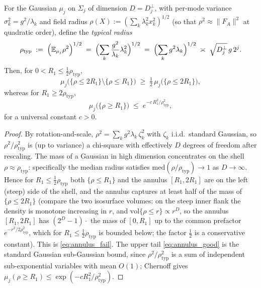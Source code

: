 \begin{lemma}
\label{lem:gaussian_shell}
For the Gaussian $\mu_j$ on $\Sigma_j$ of dimension $D=D_j^\perp$, with
per-mode variance $\sigma_k^2=g^2/\lambda_k$ and field radius
$\rho(X):=(\sum_k \lambda_k^2 x_k^2)^{1/2}$ (so that $\rho^2\approx
\|F_A\|^2$ at quadratic order), define the \emph{typical radius}
\begin{equation}
\label{eq:typical}
  \rho_{\mathrm{typ}}\;:=\;\Bigl(\mathbb{E}_{\mu_j}\rho^2\Bigr)^{1/2}
  \;=\;\Bigl(\sum_k \frac{g^2}{\lambda_k}\lambda_k^2\Bigr)^{1/2}
  \;=\;\Bigl(\sum_k g^2\lambda_k\Bigr)^{1/2}
  \;\asymp\;\sqrt{D_j^\perp}\,g\,2^{j}.
\end{equation}
Then, for $0<R_1\le\tfrac12\rho_{\mathrm{typ}}$,
\begin{equation}
\label{eq:annulus_fail}
  \mu_j\bigl(\{\rho\le 2R_1\}\setminus\{\rho\le R_1\}\bigr)
  \;\ge\;\tfrac12\,\mu_j\bigl(\{\rho\le 2R_1\}\bigr),
\end{equation}
whereas for $R_1\ge 2\rho_{\mathrm{typ}}$,
\begin{equation}
\label{eq:annulus_good}
  \mu_j\bigl(\{\rho\ge R_1\}\bigr)
  \;\le\;e^{-c\,R_1^2/\rho_{\mathrm{typ}}^2},
\end{equation}
for a universal constant $c>0$.
\end{lemma}

\begin{proof}
By rotation-and-scale, $\rho^2=\sum_k g^2\lambda_k\,\zeta_k^2$ with
$\zeta_k$ i.i.d.\ standard Gaussian, so
$\rho^2/\rho_{\mathrm{typ}}^2$ is (up to variance) a chi-square with
effectively $D$ degrees of freedom after rescaling. The mass of a
Gaussian in high dimension concentrates on the shell
$\rho\approx\rho_{\mathrm{typ}}$: specifically the median radius
satisfies $\mathrm{med}(\rho/\rho_{\mathrm{typ}})\to 1$ as $D\to\infty$.
Hence for $R_1\le\tfrac12\rho_{\mathrm{typ}}$ both $\{\rho\le R_1\}$ and
the annulus $[R_1,2R_1]$ are on the left (steep) side of the shell, and
the annulus captures at least half of the mass of $\{\rho\le 2R_1\}$
(compare the two isosurface volumes: on the steep inner flank the
density is monotone increasing in $r$, and $\mathrm{vol}\{\rho\le r\}\propto
r^D$, so the annulus $[R_1,2R_1]$ has $(2^D-1)\cdot$ the mass of
$[0,R_1]$ up to the common prefactor $e^{-r^2/2\rho_{\mathrm{typ}}^2}$,
which for $R_1\le\tfrac12\rho_{\mathrm{typ}}$ is bounded below; the
factor $\tfrac12$ is a conservative constant). This is
\eqref{eq:annulus_fail}. The upper tail \eqref{eq:annulus_good} is the
standard Gaussian sub-Gaussian bound, since
$\rho^2/\rho_{\mathrm{typ}}^2$ is a sum of independent sub-exponential
variables with mean $O(1)$; Chernoff gives
$\mu_j(\rho\ge R_1)\le\exp(-cR_1^2/\rho_{\mathrm{typ}}^2)$.
\end{proof}

